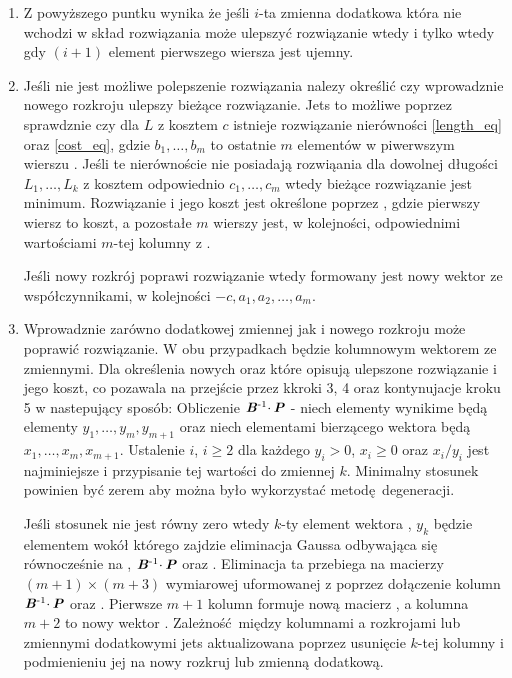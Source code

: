 \begin{enumerate}
\item Z powyższego puntku wynika że jeśli $i$-ta zmienna dodatkowa która nie wchodzi w skład rozwiązania może ulepszyć rozwiązanie wtedy i tylko wtedy gdy $(i+1)$ element pierwszego wiersza  jest ujemny.

\item Jeśli nie jest możliwe polepszenie rozwiązania nalezy określić czy wprowadznie nowego rozkroju ulepszy bieżące rozwiązanie. Jets to możliwe poprzez sprawdznie czy dla $L$ z kosztem $c$ istnieje rozwiązanie nierówności \ref{length_eq} oraz \ref{cost_eq}, gdzie $b_1,\dots,b_m$ to ostatnie $m$ elementów w piwerwszym wierszu . Jeśli te nierównoście nie posiadają rozwiąania dla dowolnej długości $L_1,\dots,L_k$ z kosztem odpowiednio $c_1,\dots,c_m$ wtedy bieżące rozwiązanie jest minimum. Rozwiązanie i jego koszt jest określone poprzez , gdzie pierwszy wiersz to koszt, a pozostałe $m$ wierszy jest, w kolejności, odpowiednimi wartościami $m$-tej kolumny z .

Jeśli nowy rozkrój poprawi rozwiązanie wtedy formowany jest nowy wektor  ze współczynnikami, w kolejności $-c,a_1,a_2,\dots,a_m$.

\item Wprowadznie zarówno dodatkowej zmiennej jak i nowego rozkroju może poprawić rozwiązanie. W obu przypadkach  będzie kolumnowym wektorem ze zmiennymi. Dla określenia nowych  oraz  które opisują ulepszone rozwiązanie i jego koszt, co pozawala na przejście przez kkroki 3, 4 oraz kontynujacje kroku 5 w nastepujący sposób: Obliczenie $\textbf{\textit{B}}\textsuperscript{-1} \cdotp \textbf{\textit{P}}$ - niech elementy wynikime będą elementy $y_1,\dots,y_m,y_{m+1}$ oraz niech elementami bierzącego wektora  będą $x_1,\dots,x_m,x_{m+1}$. Ustalenie $i$, $ i \ge 2$ dla każdego $y_i > 0$, $x_i \ge 0$ oraz $x_i/y_i$ jest najminiejsze i przypisanie tej wartości do zmiennej $k$. Minimalny stosunek powinien być zerem aby można było wykorzystać metodę degeneracji.

Jeśli stosunek nie jest równy zero wtedy $k$-ty element wektora , $y_k$ będzie elementem wokół którego zajdzie eliminacja Gaussa odbywająca się równocześnie na , $\textbf{\textit{B}}\textsuperscript{-1} \cdotp \textbf{\textit{P}}$ oraz . Eliminacja ta przebiega na macierzy $(m+1) \times (m+3)$ wymiarowej  uformowanej z  poprzez dołączenie kolumn $\textbf{\textit{B}}\textsuperscript{-1} \cdotp \textbf{\textit{P}}$ oraz . Pierwsze $m+1$ kolumn  formuje nową macierz , a kolumna $m+2$ to nowy wektor . Zależność między kolumnami  a rozkrojami lub zmiennymi dodatkowymi jets aktualizowana poprzez usunięcie $k$-tej kolumny i podmienieniu jej na nowy rozkruj lub zmienną dodatkową.


\end{enumerate}
